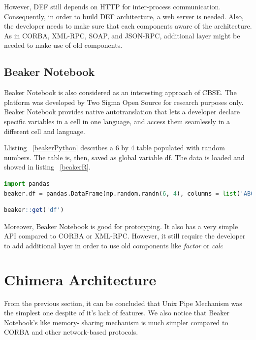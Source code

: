 \documentclass[conference]{IEEEtran}
\begin{document}
However, DEF still depends on HTTP for inter-process communication. Consequently, 
in order to build DEF architecture, a web server is needed. Also, the developer needs 
to make sure that each components aware of the architecture. As in CORBA, XML-RPC, 
SOAP, and JSON-RPC, additional layer might be needed to make use of old components.

\subsection{Beaker Notebook}

Beaker Notebook \cite{beakernotebook} is also considered as an interesting 
approach of CBSE. The platform was developed by Two Sigma Open Source 
for research purposes only. Beaker Notebook provides native autotranslation that 
lets a developer declare specific variables in a cell in one language, 
and access them seamlessly in a different cell and language.

Llisting ~\ref{beakerPython} describes a 6 by 4 table populated with
random numbers. The table is, then, saved as global variable df. 
The data is loaded and showed in listing ~\ref{beakerR}.

\begin{lstlisting}[caption=Beaker Python Cell Example, label=beakerPython, language=python, basicstyle=\small, breaklines=true]
import pandas
beaker.df = pandas.DataFrame(np.random.randn(6, 4), columns = list('ABCD'))
\end{lstlisting}

\begin{lstlisting}[caption=Beaker R Cell Example, label=beakerR, language=R, basicstyle=\small, breaklines=true]
beaker::get('df')
\end{lstlisting}

Moreover, Beaker Notebook is good for prototyping. It also has a very simple API compared to
CORBA or XML-RPC. However, it still require the developer to add additional layer
in order to use old components like {\it factor} or {\it calc}


\section{Chimera Architecture}

From the previous section, it can be concluded that Unix Pipe Mechanism was the simplest one
despite of it's lack of features. We also notice that Beaker Notebook's like memory-
sharing mechanism is much simpler compared to CORBA and other network-based protocols.
\end{document}
